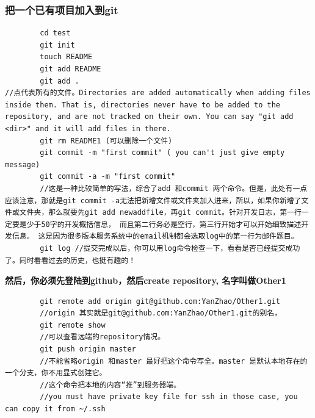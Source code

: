\documentclass[a4paper,12pt,twoside]{book}
\begin{document}
\begin{CJK*}{UTF8}{song}
\subsubsection{把一个已有项目加入到git}
        \begin{verbatim}
		cd test
		git init
		touch README
		git add README
		git add . 
//点代表所有的文件。Directories are added automatically when adding files inside them. That is, directories never have to be added to the repository, and are not tracked on their own. You can say "git add <dir>" and it will add files in there.
		git rm README1 (可以删除一个文件)
		git commit -m "first commit" ( you can't just give empty message)
		git commit -a -m "first commit"
		//这是一种比较简单的写法，综合了add 和commit 两个命令。但是，此处有一点应该注意，那就是git commit -a无法把新增文件或文件夹加入进来，所以，如果你新增了文件或文件夹，那么就要先git add newaddfile，再git commit。针对开发日志，第一行一定要是少于50字的开发概括信息， 而且第二行务必是空行，第三行开始才可以开始细致描述开发信息。 这是因为很多版本服务系统中的email机制都会选取log中的第一行为邮件题目。
		git log //提交完成以后，你可以用log命令检查一下，看看是否已经提交成功了。同时看看过去的历史，也挺有趣的！
        \end{verbatim}
        \textbf{然后，你必须先登陆到github，然后create repository, 名字叫做Other1}
        \begin{verbatim}
		git remote add origin git@github.com:YanZhao/Other1.git
		//origin 其实就是git@github.com:YanZhao/Other1.git的别名，
		git remote show
		//可以查看远端的repository情况。
		git push origin master 	
        //不能省略origin 和master 最好把这个命令写全。master 是默认本地存在的一个分支，你不用显式创建它。
		//这个命令把本地的内容“推”到服务器端。
		//you must have private key file for ssh in those case, you can copy it from ~/.ssh
		\end{verbatim}


\end{CJK*}
\end{document}
